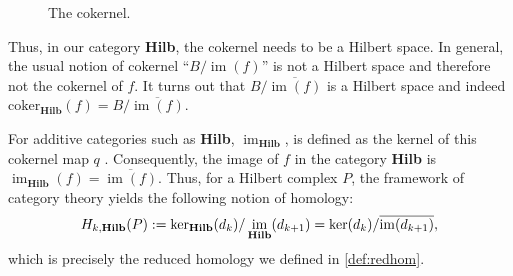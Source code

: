 \documentclass[11pt]{article}
\theoremstyle{definition}
\theoremstyle{remark}
\DeclareMathOperator{\im}{im}
\begin{document}
\begin{appendices}
\begin{figure}[H]
\begin{center}
\caption{The cokernel.} \label{im:defcoker}
\end{center}
\end{figure}

Thus, in our category \textbf{Hilb}, the cokernel needs to be a Hilbert space. In general, the usual notion of cokernel ``$B/\im(f)$'' is not a Hilbert space and therefore not the cokernel of $f$. It turns out that $B/\overline{\im(f)}$ is a Hilbert space and indeed $\text{coker}_{\textbf{Hilb}}(f)=B/\overline{\im(f)}$.

For additive categories such as \textbf{Hilb}, $\im_\textbf{Hilb}$, is defined as the kernel of this cokernel map $q$ \citep[see][p.~8]{tohoku}. Consequently, the image of $f$ in the category \textbf{Hilb} is $\im_\textbf{Hilb}(f)=\overline{\im(f)}$. Thus, for a Hilbert complex $P$, the framework of category theory yields the following notion of homology:
$$
     H_{k,\textbf{Hilb}}(P) := \ker_{\textnormal{\textbf{Hilb}}}(d_k) / \im_{\textnormal{\textbf{Hilb}}}(d_{k+1}) = \ker(d_k)/\overline{\im(d_{k+1})},
$$
which is precisely the reduced homology we defined in \cref{def:redhom}.

\end{appendices}


\vfill\eject





\end{document}
